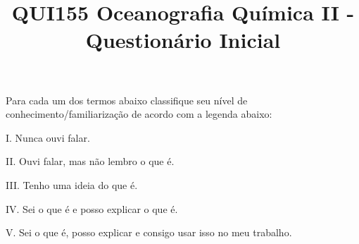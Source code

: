 \documentclass[a4paper,10pt]{article}
\title{QUI155 Oceanografia Química II - Questionário Inicial}
\author{\vspace{-10ex}}
\date{\vspace{-10ex}}
\begin{document}
  \maketitle
  \onehalfspace

%

Para cada um dos termos abaixo classifique seu nível de conhecimento/familiarização de acordo com a legenda abaixo:

\begin{multicols}{2}

I. Nunca ouvi falar.

II. Ouvi falar, mas não lembro o que é.

III. Tenho uma ideia do que é.

IV. Sei o que é e posso explicar o que é.

V. Sei o que é, posso explicar e consigo usar isso no meu trabalho.

\end{multicols}
\end{document}
